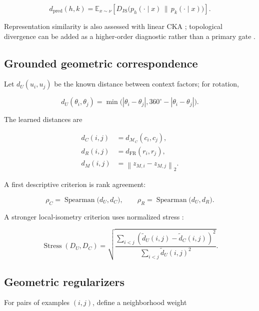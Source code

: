 \documentclass[11pt,a4paper]{article}
\newcommand{\E}{\mathbb{E}}
\newcommand{\JS}{D_{\mathrm{JS}}}
\newcommand{\norm}[1]{\left\lVert #1 \right\rVert}
\begin{document}
\begin{equation}
 d_{\mathrm{pred}}(h,k)=\E_{x\sim\nu}\left[\JS\bigl(p_h(\cdot\mid x)\,\|\,p_k(\cdot\mid x)\bigr)\right].
\end{equation}

Representation similarity is also assessed with linear CKA \citep{kornblith2019cka}; topological divergence can be added as a higher-order diagnostic rather than a primary gate \citep{barannikov2022rtd}.

\subsection{Grounded geometric correspondence}

Let \(d_U(u_i,u_j)\) be the known distance between context factors; for rotation,

\begin{equation}
 d_U(\theta_i,\theta_j)=\min\bigl(|\theta_i-\theta_j|,360^\circ-|\theta_i-\theta_j|\bigr).
\end{equation}

The learned distances are

\begin{align}
 d_C(i,j)&=d_{\mathcal{M}_C}(c_i,c_j),\\
 d_R(i,j)&=d_{\mathrm{FR}}(r_i,r_j),\\
 d_M(i,j)&=\norm{z_{M,i}-z_{M,j}}_2.
\end{align}

A first descriptive criterion is rank agreement:

\begin{equation}
 \rho_C=\operatorname{Spearman}\bigl(d_U,d_C\bigr),\qquad
 \rho_R=\operatorname{Spearman}\bigl(d_U,d_R\bigr).
\end{equation}

A stronger local-isometry criterion uses normalized stress \citep{kruskal1964mds}:

\begin{equation}
 \operatorname{Stress}(D_U,D_C)=
 \sqrt{\frac{\sum_{i<j}(\tilde d_U(i,j)-\tilde d_C(i,j))^2}{\sum_{i<j}\tilde d_U(i,j)^2}}.
\end{equation}

\subsection{Geometric regularizers}

For pairs of examples \((i,j)\), define a neighborhood weight
\end{document}
